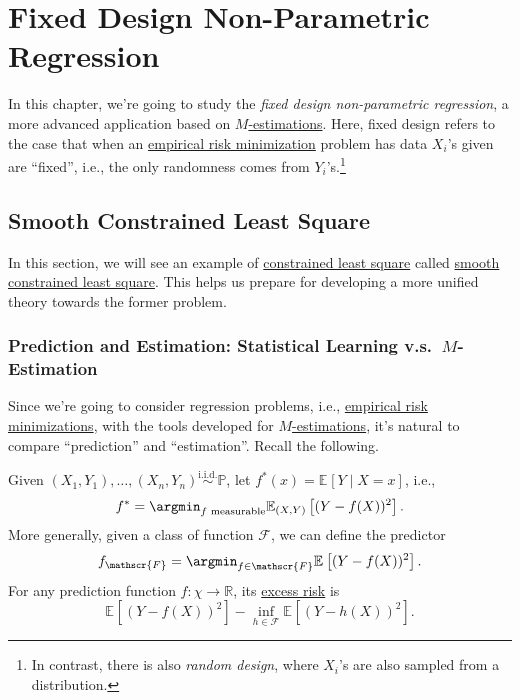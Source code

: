 
\chapter{Fixed Design Non-Parametric Regression}
In this chapter, we're going to study the \emph{fixed design non-parametric regression}, a more advanced application based on \hyperref[prb:M-estimation]{\(M\)-estimations}. Here, fixed design refers to the case that when an \hyperref[prb:ERM]{empirical risk minimization} problem has data \(X_i\)'s given are ``fixed'', i.e., the only randomness comes from \(Y_i\)'s.\footnote{In contrast, there is also \emph{random design}, where \(X_i\)'s are also sampled from a distribution.}

\section{Smooth Constrained Least Square}
In this section, we will see an example of \hyperref[prb:constrained-LS]{constrained least square} called \hyperref[prb:smooth-LS]{smooth constrained least square}. This helps us prepare for developing a more unified theory towards the former problem.

\subsection{Prediction and Estimation: Statistical Learning v.s.\ \(M\)-Estimation}
Since we're going to consider regression problems, i.e., \hyperref[prb:ERM]{empirical risk minimizations}, with the tools developed for \hyperref[prb:M-estimation]{\(M\)-estimations}, it's natural to compare ``prediction'' and ``estimation''. Recall the following.

\begin{prev}[Prediction]
	Given \((X_1, Y_1), \dots , (X_n, Y_n) \overset{\text{i.i.d.} }{\sim } \mathbb{P} \), let \(f^{\ast} (x) = \mathbb{E}_{}\left[Y \mid X = x \right] \), i.e.,
	\[
		f^{\ast} = \argmin_{f \text{ measurable} } \mathbb{E}_{(X, Y)}\left[ ( Y - f(X) ) ^2 \right] .
	\]
	More generally, given a class of function \(\mathscr{F} \), we can define the predictor
	\[
		f_{\mathscr{F} } = \argmin_{f\in \mathscr{F} } \mathbb{E}_{}\left[ ( Y - f(X) ) ^2 \right] .
	\]
	For any prediction function \(f\colon \chi \to \mathbb{R} \), its \hyperref[def:excess-risk]{excess risk} is
	\[
		\mathbb{E}_{}\left[ ( Y - f(X) ) ^2 \right] - \inf _{h \in \mathscr{F} } \mathbb{E}_{}\left[( Y - h(X) ) ^2 \right] .
	\]
\end{prev}

